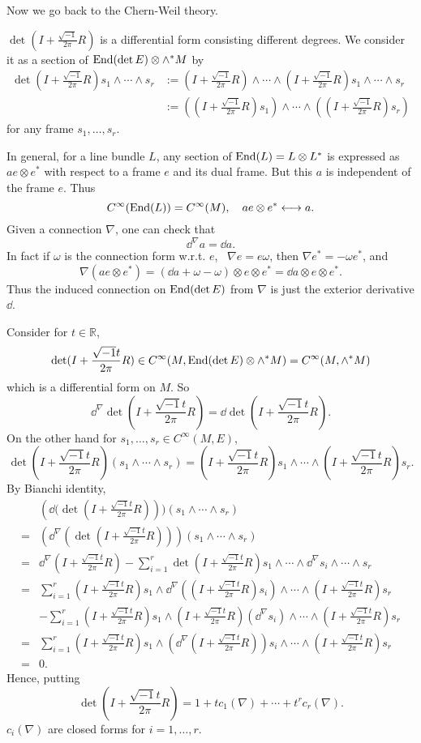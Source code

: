 \documentclass[12pt]{article}
\begin{document}
Now we go back to the Chern-Weil theory.

\(\det(I+\frac{\sqrt{-1}}{2\pi}R)\) is a differential form consisting different
degrees. We consider it as a section of \(\operatorname{End}(\det E)\otimes\wedge^*M\) by
\begin{align*}
  \det(I+\frac{\sqrt{-1}}{2\pi}R)s_1\wedge\cdots\wedge s_r&:=
  (I+\frac{\sqrt{-1}}{2\pi}R)\wedge\cdots\wedge(I+\frac{\sqrt{-1}}{2\pi}R)
  s_1\wedge\cdots\wedge s_r \\ &:=((I+\frac{\sqrt{-1}}{2\pi}R)s_1)\wedge\cdots
  \wedge((I+\frac{\sqrt{-1}}{2\pi}R)s_r)
\end{align*} 
for any frame \(s_1,\ldots,s_r\).

In general, for a line bundle \(L\), any section of \(\operatorname{End}(L)=L\otimes L^*\)
is expressed as \(ae\otimes e^*\) with respect to a frame \(e\) and its dual
frame. But this \(a\) is independent of the frame \(e\). Thus \[
  C^\infty(\operatorname{End}(L))=C^\infty(M),\quad ae \otimes e^*\longleftrightarrow a
.\] Given a connection \(\nabla\), one can check that \[
  \dd^\nabla a=\dd{a}
.\] In fact if \(\omega\) is the connection form w.r.t. \(e\), \ie\ \(\nabla e
=e\omega\), then \(\nabla e^*=-\omega e^*\), and \[
  \nabla (ae\otimes e^*)=(\dd{a}+\omega-\omega)\otimes e\otimes e^*
  =\dd{a}\otimes e\otimes e^*
.\] Thus the induced connection on \(\operatorname{End}(\det E)\) from \(\nabla\) is
just the exterior derivative \(\dd{}\).

Consider for \(t\in \mathbb{R}\), \[
  \det(I+\frac{\sqrt{-1}t}{2\pi}R)\in C^\infty(M,\operatorname{End}(\det E)\otimes 
  \wedge^*M)=C^\infty(M,\wedge^*M)
\] which is a differential form on \(M\). So \[
  \dd^\nabla\det(I+\frac{\sqrt{-1}t}{2\pi}R)
  =\dd{\det(I+\frac{\sqrt{-1}t}{2\pi}R)}
.\] On the other hand for \(s_1,\ldots,s_r\in C^\infty(M,E)\), \[
  \det(I+\frac{\sqrt{-1}t}{2\pi}R)(s_1\wedge\cdots\wedge s_r)
  =(I+\frac{\sqrt{-1}t}{2\pi}R)s_1\wedge\cdots\wedge
  (I+\frac{\sqrt{-1}t}{2\pi}R)s_r
.\] By Bianchi identity,
\begin{align*}
  &(\dd\big(\det(I+\frac{\sqrt{-1}t}{2\pi}R)))(s_1\wedge\cdots\wedge s_r) \\
  =&(\dd^\nabla(\det(I+\frac{\sqrt{-1}t}{2\pi}R)))(s_1\wedge\cdots\wedge s_r) \\
  =&\dd^\nabla (I+\frac{\sqrt{-1}t}{2\pi}R)
  -\sum_{i=1}^r\det(I+\frac{\sqrt{-1}t}{2\pi}R)s_1\wedge\cdots \wedge\dd^\nabla 
  s_i\wedge\cdots \wedge s_r \\
  =&\sum_{i=1}^{r}(I+\frac{\sqrt{-1}t}{2\pi}R)s_1\wedge\dd^\nabla ((I+\frac{
  \sqrt{-1}t}{2\pi}R)s_i)\wedge\cdots \wedge(I+\frac{\sqrt{-1}t}{2\pi}R)s_r \\
  &-\sum_{i=1}^{r}(I+\frac{\sqrt{-1}t}{2\pi}R)s_1\wedge(I+\frac{\sqrt{-1}t}{2\pi}
  R)(\dd^\nabla s_i)\wedge\cdots \wedge(I+\frac{\sqrt{-1}t}{2\pi}R)s_r \\
  =&\sum_{i=1}^{r}(I+\frac{\sqrt{-1}t}{2\pi}R)s_1\wedge(\dd^\nabla (I+\frac{
  \sqrt{-1}t}{2\pi}R))s_i\wedge\cdots \wedge(I+\frac{\sqrt{-1}t}{2\pi}R)s_r \\
  =&0
.\end{align*}
Hence, putting \[
  \det(I+\frac{\sqrt{-1}t}{2\pi}R)=1+t c_1(\nabla)+\cdots +t^r c_r(\nabla)
.\] \(c_i(\nabla)\) are closed forms for \(i=1,\ldots,r\).
\end{document}
